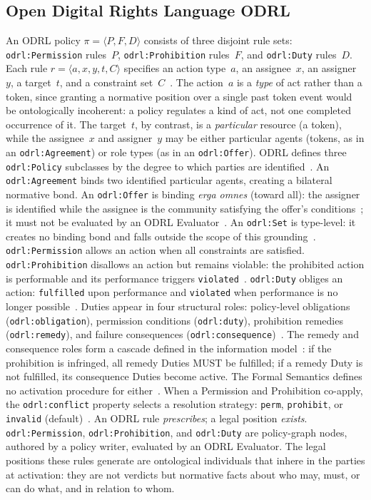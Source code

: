 \documentclass{IOS-Book-Article}
\newcommand{\odrl}[1]{\texttt{odrl:#1}}
\theoremstyle{definition}
\begin{document}
\subsection{Open Digital Rights Language ODRL}
\label{sec:odrl}
An ODRL policy $\pi = \langle P, F, D \rangle$ consists of three disjoint
rule sets: \odrl{Permission} rules~$P$, \odrl{Prohibition} rules~$F$, and
\odrl{Duty} rules~$D$. Each rule $r = \langle a, x, y, t, C \rangle$
specifies an action type~$a$, an assignee~$x$, an assigner~$y$, a
target~$t$, and a constraint set~$C$~\cite{iannella2018odrl}. The
action~$a$ is a \emph{type} of act rather than a token, since granting a
normative position over a single past token event would be ontologically
incoherent: a policy regulates a kind of act, not one completed
occurrence of it. The target~$t$, by contrast, is a \emph{particular}
resource (a token), while the assignee~$x$ and assigner~$y$ may be either
particular agents (tokens, as in an \odrl{Agreement}) or role types (as in
an \odrl{Offer}).
ODRL defines three 
\odrl{Policy} subclasses by the degree to which parties are 
identified~\cite{iannella2018odrl}. An \odrl{Agreement} 
binds two identified particular agents, creating a bilateral 
normative bond. An \odrl{Offer} is binding \emph{erga omnes} (toward all): 
the assigner is identified while the assignee is the community 
satisfying the offer's conditions~\cite{griffo2021service}; it must not be evaluated by an ODRL Evaluator~\cite{odrl-formal-semantics}. An \odrl{Set} 
is type-level: it creates no binding bond and falls outside 
the scope of this grounding~\cite{iannella2018odrl}. \odrl{Permission} allows an
action when all constraints are satisfied. \odrl{Prohibition}
disallows an action but remains violable: the prohibited action
is performable and its performance triggers
\texttt{violated}~\cite{odrl-formal-semantics}. \odrl{Duty} obliges an
action: \texttt{fulfilled} upon performance and
\texttt{violated} when performance is no longer
possible~\cite{odrl-formal-semantics}. Duties appear in four structural roles: policy-level obligations (\odrl{obligation}), permission conditions (\odrl{duty}),
prohibition remedies (\odrl{remedy}), and failure consequences
(\odrl{consequence})~\cite{iannella2018odrl}. The remedy and consequence roles form a cascade defined in the 
information model~\cite{iannella2018odrl}: if the prohibition is 
infringed, all remedy Duties MUST be fulfilled; if a remedy Duty 
is not fulfilled, its consequence Duties become active. The Formal Semantics defines no activation
procedure for either~\cite{odrl-formal-semantics}.
When a Permission and Prohibition co-apply, the \odrl{conflict}
property selects a resolution strategy: \texttt{perm},
\texttt{prohibit}, or \texttt{invalid}
(default)~\cite{iannella2018odrl}. 
An ODRL rule \emph{prescribes}; a legal position \emph{exists}.
\odrl{Permission}, \odrl{Prohibition}, and \odrl{Duty} are policy-graph nodes, authored by a policy writer, evaluated by
an ODRL Evaluator. The legal positions these rules generate are ontological
individuals that inhere in the parties at activation: they are
not verdicts but normative facts about who may, must, or can do what, and in relation to whom.
\end{document}
